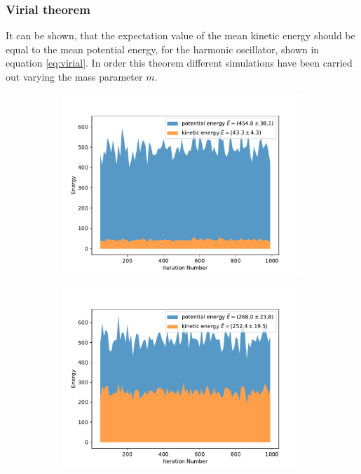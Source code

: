 \documentclass{scrartcl}
\begin{document}
	\subsubsection{Virial theorem}
		It can be shown, that the expectation value of the mean kinetic energy should be equal to the mean potential energy, for the harmonic oscillator, shown in equation \ref{eq:virial}.
		In order this theorem different simulations have been carried out varying the mass parameter $m$.
		\begin{figure}[H]
			\centering
				\begin{subfigure}[c]{0.32\textwidth}
					\includegraphics[width=\textwidth]{../imgs/harmonic_oscillator_track/track_1000100_light_virial.pdf}
					\label{fig:track_1000100_light_virial}
				\end{subfigure}
				\begin{subfigure}[c]{0.32\textwidth}
					\includegraphics[width=\textwidth]{../imgs/harmonic_oscillator_track/track_1000100_working_virial.pdf}

\end{subfigure}
\end{figure}
\end{document}
